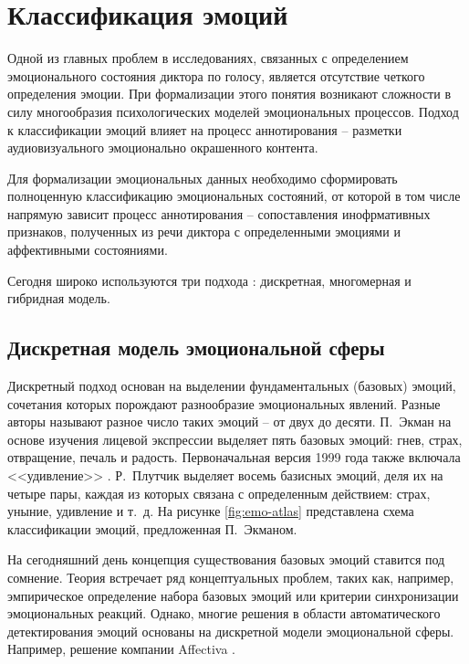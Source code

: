 \chapter{Классификация эмоций}
Одной из главных проблем в исследованиях, связанных с определением эмоционального состояния диктора по голосу, является отсутствие четкого определения эмоции. При формализации этого понятия возникают сложности в силу многообразия психологических моделей эмоциональных процессов. Подход к классификации эмоций влияет на процесс аннотирования -- разметки аудиовизуального эмоционально окрашенного контента. 

Для формализации эмоциональных данных необходимо сформировать полноценную классификацию эмоциональных состояний, от которой в том числе напрямую зависит процесс аннотирования -- сопоставления инофрмативных признаков, полученных из речи диктора с определенными эмоциями и аффективными состояниями.

Сегодня широко используются три подхода : дискретная, многомерная и гибридная модель.

\section{Дискретная модель эмоциональной сферы}
Дискретный подход основан на выделении фундаментальных (базовых) эмоций, сочетания которых порождают разнообразие эмоциональных явлений. Разные авторы называют разное число таких эмоций -- от двух до десяти. П.~Экман на основе изучения лицевой экспрессии выделяет пять базовых эмоций: гнев, страх, отвращение, печаль и радость. Первоначальная версия 1999 года также включала <<удивление>> \cite{Ekman1972, Ekman1992}. Р.~Плутчик \cite{Plutchik1980} выделяет восемь базисных эмоций, деля их на четыре пары, каждая из которых связана с определенным действием: страх, уныние, удивление и т.~д. На рисунке \ref{fig:emo-atlas} представлена схема классификации эмоций, предложенная П.~Экманом. 

На сегодняшний день концепция существования базовых эмоций ставится под сомнение. Теория встречает ряд концептуальных проблем, таких как, например, эмпирическое определение набора базовых эмоций или критерии синхронизации эмоциональных реакций. Однако, многие решения в области автоматического детектирования эмоций основаны на дискретной модели эмоциональной сферы. Например, решение компании Affectiva \cite{Affectica}.

